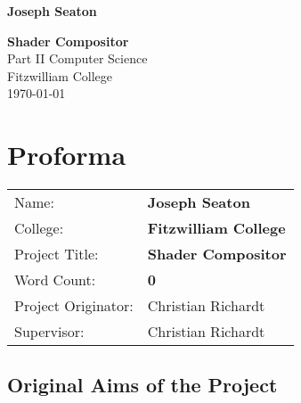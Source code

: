 \documentclass[12pt,twoside,notitlepage]{report}
\begin{document}


\newcommand{\name}{Joseph Seaton}
\newcommand{\college}{Fitzwilliam College}
\newcommand{\ptitle}{Shader Compositor}



\pagestyle{empty}

\hfill{\LARGE \bf \name}

\vspace*{60mm}
\begin{center}
\Huge
{\bf \ptitle} \\
\vspace*{5mm}
Part II Computer Science \\
\vspace*{5mm}
\college \\
\vspace*{5mm}
\today  %
\end{center}

\cleardoublepage


\setcounter{page}{1}
\pagestyle{plain}

\chapter*{Proforma}

{\large
\begin{tabular}{ll}
Name:               & \bf \name    \\
College:            & \bf \college \\
Project Title:      & \bf \ptitle  \\
Word Count:         & \bf 0\\
Project Originator: & Christian Richardt                    \\
Supervisor:         & Christian Richardt                    \\ 
\end{tabular}
}


\section*{Original Aims of the Project}
\end{document}
